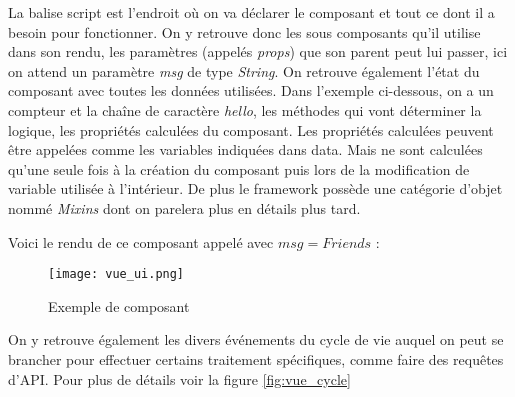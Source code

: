 La balise script est l'endroit où on va déclarer le composant et tout ce dont il a besoin pour fonctionner. On y retrouve donc les sous composants qu'il utilise dans son rendu, les paramètres (appelés \textit{props}) que son parent peut lui passer, ici on attend un paramètre \textit{msg} de type \textit{String}.
On retrouve également l'état du composant avec toutes les données utilisées. Dans l'exemple ci-dessous, on a un compteur et la chaîne de caractère \textit{hello}, les méthodes qui vont déterminer la logique, les propriétés calculées du composant. Les propriétés calculées peuvent être appelées comme les variables indiquées dans data. Mais ne sont calculées qu'une seule fois à la création du composant puis lors de la modification de variable utilisée à l'intérieur. 
De plus le framework possède une catégorie d'objet nommé \textit{Mixins} dont on parelera plus en détails plus tard.

Voici le rendu de ce composant appelé avec $msg = Friends$ :
\begin{figure}[htbp]
    \center
    \texttt{[image: vue\_ui.png]}
    \label{fig:vue_ui}
    \caption{Exemple de composant}
\end{figure}

On y retrouve également les divers événements du cycle de vie auquel on  peut se brancher pour effectuer certains traitement spécifiques, comme faire des requêtes d'API. Pour plus de détails voir la figure \ref{fig:vue_cycle}


